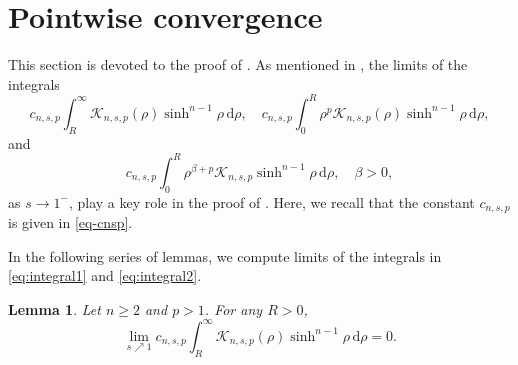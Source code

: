 \documentclass[11pt]{amsart}
\theoremstyle{plain}
\newtheorem{lemma}[theorem]{Lemma}
\theoremstyle{definition}
\numberwithin{equation}{section}
\begin{document}

\section{Pointwise convergence} \label{sec:convergence}


This section is devoted to the proof of . As mentioned in , the limits of the integrals
\begin{equation} \label{eq:integral1}
c_{n,s,p} \int_{R}^{\infty} \mathcal{K}_{n,s,p}(\rho)\sinh^{n-1}\rho \,\mathrm{d}\rho, \quad c_{n,s,p} \int_{0}^{R} \rho^{p} \mathcal{K}_{n,s,p}(\rho)\sinh^{n-1}\rho \,\mathrm{d}\rho,
\end{equation}
and
\begin{equation} \label{eq:integral2}
c_{n,s,p} \int_{0}^{R} \rho^{\beta+p} \mathcal{K}_{n,s,p} \sinh^{n-1}\rho \,\mathrm{d}\rho, \quad \beta > 0,
\end{equation}
as $s \to 1^{-}$, play a key role in the proof of . Here, we recall that the constant $c_{n, s, p}$ is given in \eqref{eq-cnsp}.

In the following series of lemmas, we compute limits of the integrals in \eqref{eq:integral1} and \eqref{eq:integral2}.

\begin{lemma} \label{lem:infty}
Let $n\geq 2$ and $p > 1$. For any $R > 0$,
\begin{equation*}
\lim_{s \nearrow 1} c_{n, s, p} \int_{R}^{\infty} \mathcal{K}_{n,s,p}(\rho)\sinh^{n-1} \rho \,\mathrm{d}\rho = 0.
\end{equation*}
\end{lemma}
\end{document}
